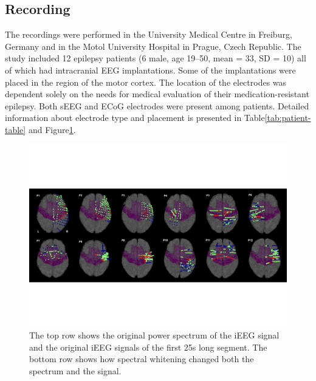 \subsection{Recording}\label{subsec:recording}
The recordings were performed in the University Medical Centre in Freiburg, Germany and in the Motol University Hospital in Prague, Czech Republic.
The study included 12 epilepsy patients (6 male, age 19--50, mean = 33, SD = 10) all of which had intracranial EEG implantations.
Some of the implantations were placed in the region of the motor cortex.
The location of the electrodes was dependent solely on the needs for medical evaluation of their medication-resistant epilepsy.
Both sEEG and ECoG electrodes were present among patients.
Detailed information about electrode type and placement is presented in Table\ref{tab:patient-table} and Figure\ref{fig:electrodes}.

\begin{figure}
\centering
\includegraphics[width=\linewidth]{img/ch3/electrodes}
\caption{The top row shows the original power spectrum of the iEEG signal and the original iEEG signals of the first 25s long segment.
The bottom row shows how spectral whitening changed both the spectrum and the signal.}
\label{fig:electrodes}
\end{figure}

